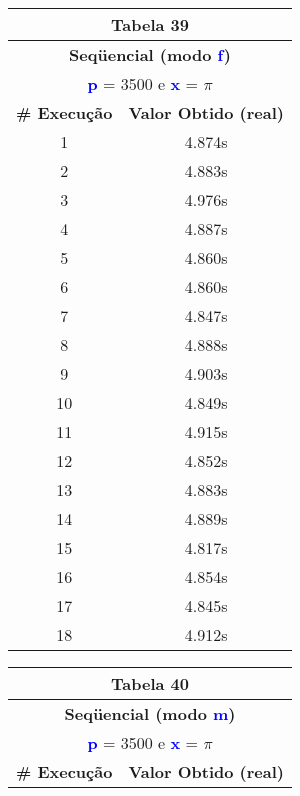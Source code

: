 \documentclass[11pt]{article}
\begin{document}
\begin{table}[!h]
	\begin{center}
		\begin{minipage}{0.48\textwidth}
			\begin{tabular}{| c | c |}
			\hline
			\multicolumn{2}{|c|}{\textbf{Tabela 39}} \\ \hline
			\multicolumn{2}{|c|}{\textbf{Seqüencial (modo \textbf{\textcolor{blue}{f}})}} \\
			\multicolumn{2}{|c|}{\textbf{\textcolor{blue}{p}} = 3500 e \textbf{\textcolor{blue}{x}} = $\pi$} \\ [0.2ex]
			\hline
				\textbf{\# Execução} &  \textbf{Valor Obtido (real)} \\ \hline
				1 & 4.874s \\ \hline
				2 & 4.883s \\ \hline
				3 & 4.976s \\ \hline
				4 & 4.887s \\ \hline
				5 & 4.860s \\ \hline
				6 & 4.860s \\ \hline
				7 & 4.847s \\ \hline
				8 & 4.888s \\ \hline
				9 & 4.903s \\ \hline
				10 & 4.849s \\ \hline
				11 & 4.915s \\ \hline
				12 & 4.852s \\ \hline
				13 & 4.883s \\ \hline
				14 & 4.889s \\ \hline
				15 & 4.817s \\ \hline
				16 & 4.854s \\ \hline
				17 & 4.845s \\ \hline
				18 & 4.912s \\ \hline
			\end{tabular}
		\end{minipage}
		\begin{minipage}{0.48\textwidth}
			\begin{tabular}{| c | c |}
			\hline
			\multicolumn{2}{|c|}{\textbf{Tabela 40}} \\ \hline
			\multicolumn{2}{|c|}{\textbf{Seqüencial (modo \textbf{\textcolor{blue}{m}})}} \\
			\multicolumn{2}{|c|}{\textbf{\textcolor{blue}{p}} = 3500 e \textbf{\textcolor{blue}{x}} = $\pi$} \\ [0.2ex]
			\hline
				\textbf{\# Execução} &  \textbf{Valor Obtido (real)} \\ \hline

\end{tabular}
\end{minipage}
\end{center}
\end{table}
\end{document}
